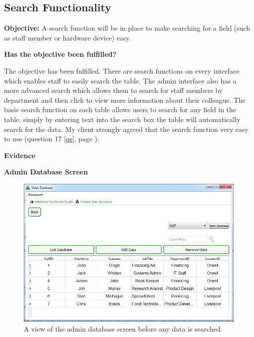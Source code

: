\subsection{Search Functionality}\label{search}

\textbf{Objective:} A search function will be in place to make searching for a field (such as staff member or hardware device) easy.

\textbf{Has the objective been fulfilled?}

The objective has been fulfilled. There are search functions on every interface which enables staff to easily search the table. The admin interface also has a more advanced search which allows them to search for staff members by department and then click to view more information about their colleague. The basic search function on each table allows users to search for any field in the table, simply by entering text into the search box the table will automatically search for the data. My client strongly agreed that the search function very easy to use (question 17 \ref{qs}, page \pageref{qs}).

\textbf{Evidence}

\textbf{Admin Database Screen}

\begin{figure}[H]
    \includegraphics[width=\textwidth]{./Evaluation/Images/beforeadminsearch.png}
    \caption{A view of the admin database screen before any data is searched.} 
\end{figure}


